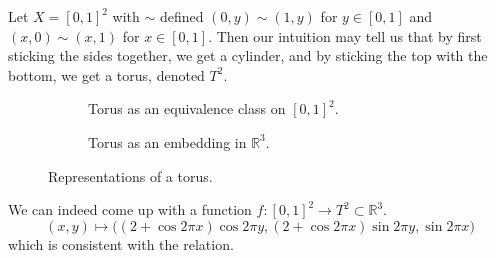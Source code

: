   \begin{example}[Torus]
    Let $X = [0,1]^2$ with $\sim$ defined $(0, y) \sim (1, y)$ for $y \in [0, 1]$ and $(x, 0) \sim (x, 1)$ for $x \in [0, 1]$. Then our intuition may tell us that by first sticking the sides together, we get a cylinder, and by sticking the top with the bottom, we get a torus, denoted $T^2$. 

    \begin{figure}[H]
      \centering
      \begin{subfigure}[b]{0.48\textwidth}
        \centering
        \caption{Torus as an equivalence class on $[0, 1]^2$.}
        \label{fig:square_torus}
      \end{subfigure}
      \hfill 
      \begin{subfigure}[b]{0.48\textwidth}
        \centering
        \caption{Torus as an embedding in $\mathbb{R}^3$.}
        \label{fig:torus}
      \end{subfigure}
      \caption{Representations of a torus.}
      \label{fig:geometric-figures}
    \end{figure}

    We can indeed come up with a function $f: [0, 1]^2 \rightarrow T^2 \subset \mathbb{R}^3$. 
    \begin{equation}
      (x, y) \mapsto \big( (2 + \cos{2 \pi x}) \cos{2\pi y}, (2 + \cos{2 \pi x}) \sin{2 \pi y}, \sin{2 \pi x} \big)
    \end{equation}
    which is consistent with the relation.  


\end{example}
